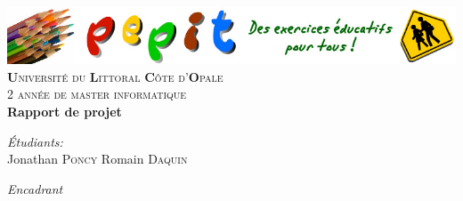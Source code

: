 
\begin{titlepage}

\begin{center}


\includegraphics[width=16cm]{images/pepit-logo}\\[1cm]    

\textsc{\LARGE \textbf{U}niversité du \textbf{L}ittoral \textbf{C}ôte d'\textbf{O}pale}\\[1.5cm]
\textsc{\Large 2\ieme{} année de master informatique}\\[0.5cm]


{ \huge \bfseries Rapport de projet}\\[0.4cm]


\begin{minipage}{0.3\textwidth}
\begin{flushleft} \large
\emph{Étudiants:}\\
Jonathan \textsc{Poncy}
Romain \textsc{Daquin}
\end{flushleft}
\end{minipage}
\begin{minipage}{0.3\textwidth}
\begin{flushright} \large
\emph{Encadrant} \\
\responsableProjet
\end{flushright}
\end{minipage}

\vfill


\end{center}
\end{titlepage}
